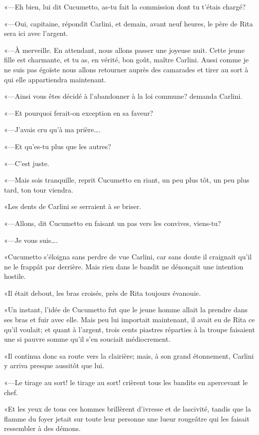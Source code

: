 «—Eh bien, lui dit Cucumetto, as-tu fait la commission dont tu t'étais chargé? 

«—Oui, capitaine, répondit Carlini, et demain, avant neuf heures, le père de Rita sera ici avec l'argent. 

«—À merveille. En attendant, nous allons passer une joyeuse nuit. Cette jeune fille est charmante, et tu as, en vérité, bon goût, maître Carlini. Aussi comme je ne suis pas égoïste nous allons retourner auprès des camarades et tirer au sort à qui elle appartiendra maintenant. 

«—Ainsi vous êtes décidé à l'abandonner à la loi commune? demanda Carlini. 

«—Et pourquoi ferait-on exception en sa faveur? 

«—J'avais cru qu'à ma prière\dots. 

«—Et qu'es-tu plus que les autres? 

«—C'est juste. 

«—Mais sois tranquille, reprit Cucumetto en riant, un peu plus tôt, un peu plus tard, ton tour viendra. 

«Les dents de Carlini se serraient à se briser. 

«—Allons, dit Cucumetto en faisant un pas vers les convives, viens-tu? 

«—Je vous suis\dots. 

«Cucumetto s'éloigna sans perdre de vue Carlini, car sans doute il craignait qu'il ne le frappât par derrière. Mais rien dans le bandit ne dénonçait une intention hostile. 

«Il était debout, les bras croisés, près de Rita toujours évanouie. 

«Un instant, l'idée de Cucumetto fut que le jeune homme allait la prendre dans ses bras et fuir avec elle. Mais peu lui importait maintenant, il avait eu de Rita ce qu'il voulait; et quant à l'argent, trois cents piastres réparties à la troupe faisaient une si pauvre somme qu'il s'en souciait médiocrement. 

«Il continua donc sa route vers la clairière; mais, à son grand étonnement, Carlini y arriva presque aussitôt que lui. 

«—Le tirage au sort! le tirage au sort! crièrent tous les bandits en apercevant le chef. 

«Et les yeux de tous ces hommes brillèrent d'ivresse et de lascivité, tandis que la flamme du foyer jetait sur toute leur personne une lueur rougeâtre qui les faisait ressembler à des démons. 

